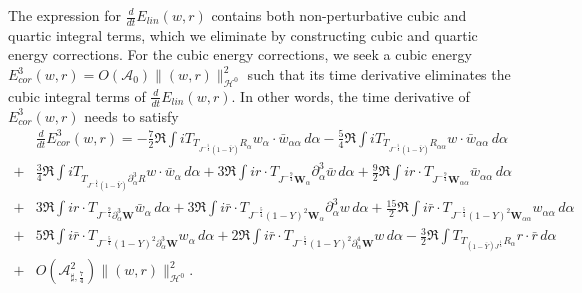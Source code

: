 \documentclass[10pt]{amsart}
\theoremstyle{remark}
\theoremstyle{definition}
\numberwithin{equation}{section}
\newcommand{\p}{\partial}
\renewcommand{\H}{{\mathcal H }}
\newcommand{\al}{\alpha}
\newcommand{\f}{\frac}
\newcommand{\bw}{\mathbf{W}}
\newcommand{\CalAZ}{{\mathcal{A}_0}}
\newcommand{\ASSharp}{{\mathcal{A}_{\sharp,\frac{7}{4}}^2}}
\begin{document}
The expression for $\frac{d}{dt}E_{lin}(w,r)$ contains both non-perturbative cubic and quartic integral terms, which we eliminate by constructing cubic and quartic energy corrections.
For the cubic energy corrections, we seek a cubic energy $E_{cor}^3(w,r) = O(\CalAZ)\|(w,r)\|_{\H^0}^2$ such that its time derivative eliminates the cubic integral terms of $\frac{d}{dt}E_{lin}(w,r)$.
In other words, the time derivative of $E_{cor}^3(w,r)$ needs to satisfy 
\begin{align*}
&\frac{d}{dt} E_{cor}^3(w,r)
=  -\frac{7}{2}\Re \int i T_{T_{J^{-\f54}(1-\bar{Y})}R_{\al}}w_\al \cdot \bar{w}_{\al \al} \,d\al -\f54 \Re \int i T_{T_{J^{-\f54}(1-\bar{Y})}R_{\al\al}}w \cdot \bar{w}_{\al \al} \,d\al\\
+&\f34\Re \int i T_{T_{J^{-\f54}(1-\bar{Y})}\partial_\al^3 R}w \cdot \bar{w}_{\al } \,d\al+3\Re \int ir \cdot T_{J^{-\f94}\bw_\al}  \p_\al^3 \bar{w} \,d\al+\f92\Re \int ir \cdot T_{J^{-\f94}\bw_{\al \al}} \bar{w}_{\al \al} \,d\al\\
+& 3\Re \int ir \cdot T_{J^{-\f94}\p_\al^3 \bw} \bar{w}_{\al} \,d\al+3\Re \int i\bar{r}\cdot T_{J^{-\f54}(1-Y)^2 \bw_\al} \p_\al^3 w \,d\al +\frac{15}{2}\Re \int i\bar{r}\cdot T_{J^{-\f54}(1-Y)^2\bw_{\al \al}}w_{\al \al}\,d\al\\
+& 5 \Re \int i\bar{r} \cdot T_{J^{-\f54}(1-Y)^2 \p_\al^3 \bw}w_\al \,d\al +2 \Re \int i\bar{r} \cdot T_{J^{-\f54}(1-Y)^2 \p_\al^4\bw}w\,d\al -\f32\Re \int T_{T_{(1-\bar{Y})J^{\f14}}R_\al} r\cdot \bar{r} \,d\al\\
+&  O\left(\ASSharp \right) \|(w,r)\|_{\H^0}^2.
\end{align*}
\end{document}
